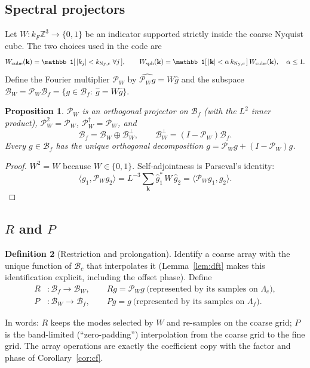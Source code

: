 \documentclass[11pt]{article}
\newtheorem{proposition}{Proposition}[section]
\theoremstyle{definition}
\newtheorem{definition}[proposition]{Definition}
\newcommand{\kk}{\mathbf{k}}
\newcommand{\PW}{\mathcal{P}_W}
\newcommand{\Bf}{\mathcal{B}_f}
\newcommand{\Bc}{\mathcal{B}_c}
\newcommand{\BW}{\mathcal{B}_W}
\newcommand{\Z}{\mathbb{Z}}
\newcommand{\Ny}{{\rm Ny}}
\begin{document}
\subsection{Spectral projectors}

Let $W:k_F\Z^3\to\{0,1\}$ be an indicator supported strictly inside the coarse Nyquist cube. The two choices used in the code are
\begin{equation}
W_{\rm cube}(\kk)=\mathbb 1[\,|k_j|<k_{\Ny,c}\ \forall j\,],\qquad
W_{\rm sph}(\kk)=\mathbb 1[\,|\kk|<\alpha\,k_{\Ny,c}\,]\,W_{\rm cube}(\kk),\quad \alpha\le1 .
\end{equation}
Define the Fourier multiplier $\PW$ by $\widehat{\PW g}=W\hat g$ and the subspace $\BW=\PW\Bf=\{g\in\Bf:\ \hat g=W\hat g\}$.

\begin{proposition}\label{prop:proj}
$\PW$ is an orthogonal projector on $\Bf$ (with the $L^2$ inner product), $\PW^2=\PW$, $\PW^\dagger=\PW$, and
\begin{equation}
\Bf=\BW\oplus\BW^{\perp},\qquad \BW^\perp=(I-\PW)\Bf .
\end{equation}
Every $g\in\Bf$ has the unique orthogonal decomposition $g=\PW g+(I-\PW)g$.
\end{proposition}
\begin{proof}
$W^2=W$ because $W\in\{0,1\}$. Self-adjointness is Parseval's identity:
\begin{equation*}
\langle g_1,\PW g_2\rangle=L^{-3}\sum_\kk \hat g_1^*\,W\,\hat g_2=\langle \PW g_1,g_2\rangle .
\end{equation*}
\end{proof}

\subsection{$R$ and $P$}

\begin{definition}[Restriction and prolongation]
Identify a coarse array with the unique function of $\Bc$ that interpolates it (Lemma~\ref{lem:dft} makes this identification explicit, including the offset phase). Define
\begin{align}
R&:\Bf\to\BW,\qquad R g=\PW g \ \text{(represented by its samples on }\Lambda_c),\\
P&:\BW\to\Bf,\qquad P g=g \ \text{(represented by its samples on }\Lambda_f).
\end{align}
\end{definition}
In words: $R$ keeps the modes selected by $W$ and re-samples on the coarse grid; $P$ is the band-limited (``zero-padding'') interpolation from the coarse grid to the fine grid. The array operations are exactly the coefficient copy with the factor and phase of Corollary~\ref{cor:cf}.
\end{document}
